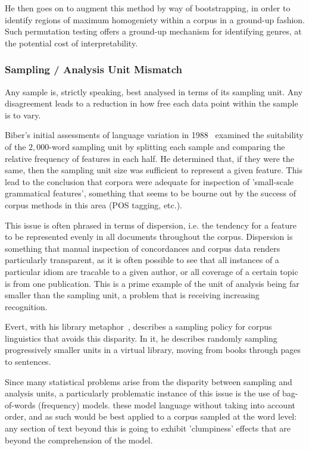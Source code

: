 He then goes on to augment this method by way of bootstrapping, in order to identify regions of maximum homogeniety within a corpus in a ground-up fashion.  Such permutation testing offers a ground-up mechanism for identifying genres, at the potential cost of interpretability.




\subsubsection{Sampling / Analysis Unit Mismatch}
Any sample is, strictly speaking, best analysed in terms of its sampling unit.  Any disagreement leads to a reduction in how free each data point within the sample is to vary\cite{kilgarriff2005language,lijffijt2014significance,paquot2009distinctive}.

Biber's initial assessments of language variation in 1988~\cite{biber1988variation} examined the suitability of the $2,000$-word sampling unit by splitting each sample and comparing the relative frequency of features in each half.  He determined that, if they were the same, then the sampling unit size was sufficient to represent a given feature.  This lead to the conclusion that corpora were adequate for inspection of 'small-scale grammatical features', something that seems to be bourne out by the success of corpus methods in this area (POS tagging, etc.).

This issue is often phrased in terms of dispersion, i.e. the tendency for a feature to be represented evenly in all documents throughout the corpus.  Dispersion is something that manual inspection of concordances and corpus data renders particularly transparent, as it is often possible to see that all instances of a particular idiom are tracable to a given author, or all coverage of a certain topic is from one publication.  This is a prime example of the unit of analysis being far smaller than the sampling unit, a problem that is receiving increasing recognition.

Evert, with his library metaphor~\cite{evert2006random}, describes a sampling policy for corpus linguistics that avoids this disparity.  In it, he describes randomly sampling progressively smaller units in a virtual library, moving from books through pages to sentences.%

Since many statistical problems arise from the disparity between sampling and analysis units, a particularly problematic instance of this issue is the use of bag-of-words (frequency) models.  these model language without taking into account order, and as such would be best applied to a corpus sampled at the word level: any section of text beyond this is going to exhibit 'clumpiness' effects that are beyond the comprehension of the model.

